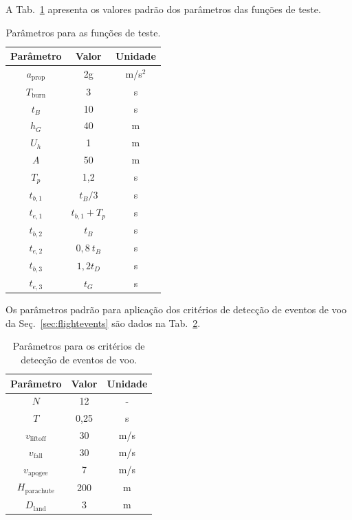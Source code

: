 \documentclass[12pt,a4paper]{article}
\begin{document}
A Tab.~\ref{tab:functiontestparameters} apresenta os valores padrão dos parâmetros das funções de teste. 
\begin{table}[!ht]
	\centering
	\caption{Parâmetros para as funções de teste.}
	\begin{tabular}{ccc}
		\toprule
		Parâmetro & Valor & Unidade\\
		\midrule
		$a_\text{prop}$&2g&m/s$^2$\\
		$T_\text{burn}$&3&s\\
		$t_B$&10&s\\
		$h_G$&40&m\\
		$U_h$&1&m\\
		$A$&50&m\\
		$T_p$&1,2&s\\
		$t_{b,1}$&$t_B/3$&s\\
		$t_{e,1}$&$t_{b,1}+T_p$&s\\
		$t_{b,2}$&$t_B$&s\\
		$t_{e,2}$&$0,8~t_B$&s\\
		$t_{b,3}$&$1,2t_{D}$&s\\
		$t_{e,3}$&$t_G$&s\\
		\bottomrule
	\end{tabular}
\label{tab:functiontestparameters}
\end{table}

Os parâmetros padrão para aplicação dos critérios de detecção de eventos de voo da Seç.~\ref{sec:flightevents} são dados na Tab.~\ref{tab:flightparameters}.
\begin{table}[!ht]
	\centering
	\caption{Parâmetros para os critérios de detecção de eventos de voo.}
	\begin{tabular}{ccc}
		\toprule
		Parâmetro & Valor & Unidade\\
		\midrule
		$N$&12&-\\
		$T$&0,25&s\\
		$v_\text{liftoff}$&30&m/s\\
		$v_\text{fall}$&30&m/s\\
		$v_\text{apogee}$&7&m/s\\
		$H_\text{parachute}$&200&m\\
		$D_\text{land}$&3&m\\
		\bottomrule
	\end{tabular}
	\label{tab:flightparameters}
\end{table}
\end{document}
